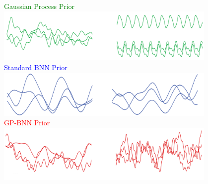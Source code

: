\documentclass[landscape,a1,final,a4resizeable]{include/a0poster}
\newcommand{\X}{\B X}
\newcommand{\D}{\mathcal{D}}
\newcommand{\B}[1]{\ensuremath{  \mathbf{#1} } }
\newcommand{\pgp}{p_{\text{\tiny GP}}}
\begin{document}
\begin{minipage}[t][0pt]{\linewidth}
\begin{poster}
\begin{multicols}{3}
\begin{minipage}[t][47.5cm][t]{.32\textwidth}
{\begin{center}  
\textcolor{Green}{Gaussian Process Prior}\\
\includegraphics[width=0.8\textwidth]{figures/prior_GP.pdf}\\
\textcolor{Blue}{Standard BNN Prior}\\
\includegraphics[width=0.8\textwidth]{figures/prior_BNN.pdf} \\   
\textcolor{Red}{GP-BNN Prior}\\
\includegraphics[width=0.8\textwidth]{figures/prior_GPBNN.pdf} \\
\end{center}


}


\end{minipage}


\hspace{0.5cm}
\begin{minipage}[t][14cm][t]{.3\textwidth}



\end{minipage}
\end{multicols}
\end{poster}
\end{minipage}
\end{document}
